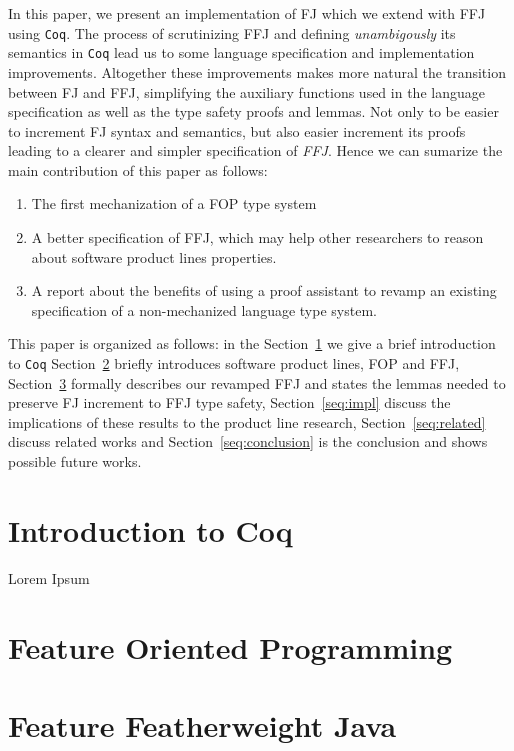 \documentclass[runningheads,a4paper]{llncs}
\begin{document}
In this paper, we present an implementation of \ac{FJ} which we extend with \ac{FFJ} using \texttt{Coq}.
The process of scrutinizing \ac{FFJ} and defining \textit{unambigously} its semantics in \texttt{Coq} lead us to some language specification and implementation improvements. 
Altogether these improvements makes more natural the transition between \ac{FJ} and \ac{FFJ}, simplifying the auxiliary functions used in the language specification as well as the type safety proofs and lemmas. 
Not only to be easier to increment \ac{FJ} syntax and semantics, but also easier increment its proofs leading to a clearer and simpler specification of \textit{FFJ}.
Hence we can sumarize the main contribution of this paper as follows:
\begin{enumerate}
    \item The first mechanization of a FOP type system
    \item A better specification of FFJ, which may help other researchers to reason about software product lines properties.
    \item A report about the benefits of using a proof assistant 
    to revamp an existing specification of a non-mechanized language type system.
\end{enumerate}

This paper is organized as follows: in the Section~\ref{seq:coq} we give a brief introduction to \texttt{Coq} 
Section~\ref{seq:fop} briefly introduces software product lines, \ac{FOP} and \ac{FFJ},
Section~\ref{seq:ffj} formally describes our revamped \ac{FFJ} and states the lemmas needed to preserve \ac{FJ} increment to \ac{FFJ} type safety, 
Section~\ref{seq:impl} discuss the implications of these results to the product line research,
Section~\ref{seq:related} discuss related works and
Section~\ref{seq:conclusion} is the conclusion and shows possible future works.

\section{Introduction to Coq}\label{seq:coq}
Lorem Ipsum

\section{Feature Oriented Programming}\label{seq:fop}

\section{Feature Featherweight Java}\label{seq:ffj}

\end{document}

